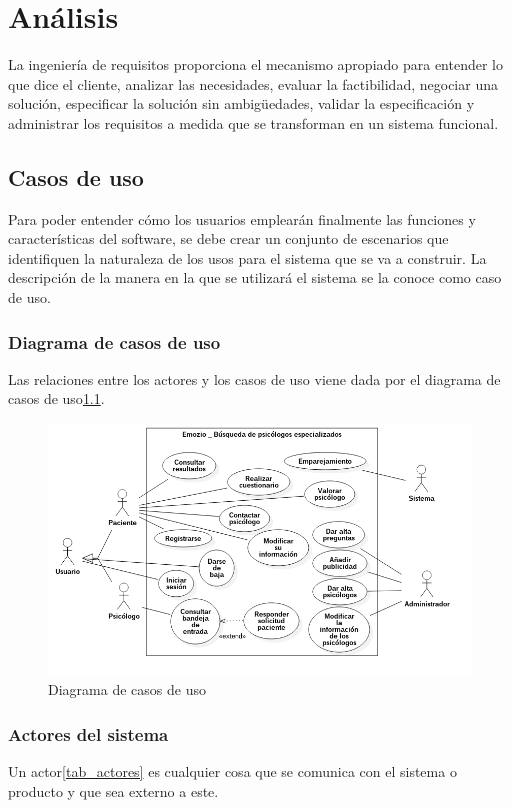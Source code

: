 \chapter{Análisis}

La ingeniería de requisitos proporciona el mecanismo apropiado para entender lo que dice el cliente, analizar las necesidades, evaluar la factibilidad, negociar una solución, especificar la solución sin ambigüedades, validar la especificación y administrar los requisitos a medida que se transforman en un sistema funcional\cite{pressman}.

\section{Casos de uso}
Para poder entender cómo los usuarios emplearán finalmente las funciones y características del software, se debe crear un conjunto de escenarios que identifiquen la naturaleza de los usos para el sistema que se va a construir. La descripción de la manera en la que se utilizará el sistema se la conoce como caso de uso.

\subsection{Diagrama de casos de uso}
Las relaciones entre los actores y los casos de uso viene dada por el diagrama de casos de uso\ref{fig:diag_casos_uso}.

\begin{figure}[htbp] 
    \centering
    \includegraphics[width=1\textwidth]{figuras/diag_casos_uso.png}
    \caption{Diagrama de casos de uso}
    \label{fig:diag_casos_uso}
\end{figure}	

\subsection{Actores del sistema}
Un actor\ref{tab_actores} es cualquier cosa que se comunica con el sistema o producto y que sea externo a este. 

